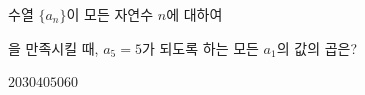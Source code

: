 \hspace*{2mm}\begin{minipage}[t]{\dimexpr\linewidth-2mm\relax}\vspace{0pt}
수열 $\{a_n\}$이 모든 자연수 $n$에 대하여 \par\smallskip{}\par\smallskip\noindent 을 만족시킬 때, $a_5=5$가 되도록 하는 모든 $a_1$의 값의 곱은?
\begin{choices32}{$20$}{$30$}{$40$}{$50$}{$60$}\end{choices32}\end{minipage}
